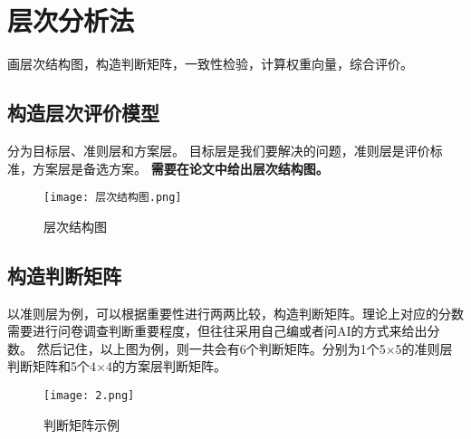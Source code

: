 \documentclass[12pt,a4paper]{article} %
\begin{document}
\tableofcontents
\newpage

\section{层次分析法}
\begin{markdownquote}
    画层次结构图，构造判断矩阵，一致性检验，计算权重向量，综合评价。
\end{markdownquote}
\subsection{构造层次评价模型}
分为目标层、准则层和方案层。
目标层是我们要解决的问题，准则层是评价标准，方案层是备选方案。
\textbf{需要在论文中给出层次结构图。}
\begin{figure}[htbp] %
  \centering %
  \texttt{[image: 层次结构图.png]} %
  \caption{层次结构图} %
  \label{fig:sample} %
\end{figure}
\subsection{构造判断矩阵}
以准则层为例，可以根据重要性进行两两比较，构造判断矩阵。理论上对应的分数需要进行问卷调查判断重要程度，但往往采用自己编或者问AI的方式来给出分数。
然后记住，以上图为例，则一共会有6个判断矩阵。分别为1个5$\times$5的准则层判断矩阵和5个4$\times$4的方案层判断矩阵。
\begin{figure}[H] %
  \centering %
  \texttt{[image: 2.png]} %
    \caption{判断矩阵示例} %
  \label{fig:judgment_matrix} %
\end{figure}
\end{document}
